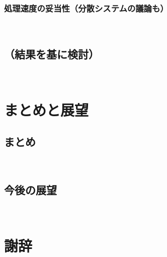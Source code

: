 \documentclass[12pt,a4j]{jreport}
\begin{document}
\subsection{処理速度の妥当性（分散システムの議論も）}
~

\section{（結果を基に検討）}
~

\chapter{まとめと展望}


\section{まとめ}
~

\section{今後の展望}
~%
~

\chapter*{謝辞}




\end{document}
